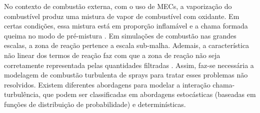 No contexto de combustão externa, com o uso de MECs, a vaporização do combustível produz uma mistura de vapor de combustível com oxidante.
Em certas condições, essa mistura está em proporção inflamável e a chama formada queima no modo de pré-mistura \cite{PoinsotVeynante2005}.
Em simulações de combustão nas grandes escalas, a zona de reação pertence a escala sub-malha.
Ademais, a característica não linear dos termos de reação faz com que a zona de reação não seja corretamente representada pelas quantidades filtradas \cite{SacomanoF2017PhD}.
Assim, faz-se necessária a modelagem de combustão turbulenta de sprays para tratar esses problemas não resolvidos.
Existem diferentes abordagens para modelar a interação chama-turbulência, que podem ser classificadas em abordagens estocásticas (baseadas em funções de distribuição de probabilidade) e  determinísticas.

